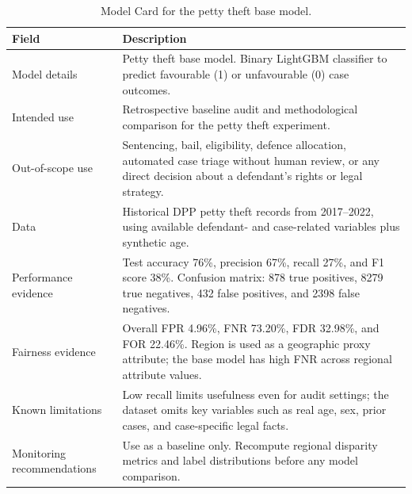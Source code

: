 \documentclass[fleqn,10pt]{wlscirep}
\begin{document}
\begin{table}[!htb]
\centering
\begin{tabular}{|p{3.5cm}|p{11cm}|}
\hline
\textbf{Field} & \textbf{Description} \\ \hline
Model details & Petty theft base model. Binary LightGBM classifier to predict favourable (1) or unfavourable (0) case outcomes. \\ \hline
Intended use & Retrospective baseline audit and methodological comparison for the petty theft experiment. \\ \hline
Out-of-scope use & Sentencing, bail, eligibility, defence allocation, automated case triage without human review, or any direct decision about a defendant's rights or legal strategy. \\ \hline
Data & Historical DPP petty theft records from 2017--2022, using available defendant- and case-related variables plus synthetic age. \\ \hline
Performance evidence & Test accuracy 76\%, precision 67\%, recall 27\%, and F1 score 38\%. Confusion matrix: 878 true positives, 8279 true negatives, 432 false positives, and 2398 false negatives. \\ \hline
Fairness evidence & Overall FPR 4.96\%, FNR 73.20\%, FDR 32.98\%, and FOR 22.46\%. Region is used as a geographic proxy attribute; the base model has high FNR across regional attribute values. \\ \hline
Known limitations & Low recall limits usefulness even for audit settings; the dataset omits key variables such as real age, sex, prior cases, and case-specific legal facts. \\ \hline
Monitoring recommendations & Use as a baseline only. Recompute regional disparity metrics and label distributions before any model comparison. \\ \hline
\end{tabular}
\caption{Model Card for the petty theft base model.}
\label{tab:model_card_pt_base}
\end{table}
\end{document}
